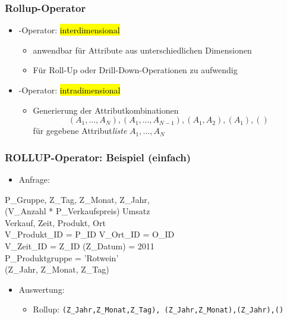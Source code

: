     \begin{frame}
    
    \frametitle{Rollup-Operator}
    
    
    \begin{itemize}
    \item {}-Operator: \hl{interdimensional}
      \begin{itemize}
      \item anwendbar für Attribute aus unterschiedlichen Dimensionen
      \item Für Roll-Up oder Drill-Down-Operationen zu aufwendig
      \end{itemize}
    \item {}-Operator: \hl{intradimensional}
      \begin{itemize}
      \item Generierung der Attributkombinationen
    $$
    (A_1, ..., A_N), (A_1, ..., A_{N-1}), (A_1, A_2), (A_1), ()
    $$
    für gegebene Attribut\textit{liste} $A_1, ..., A_N$
    \end{itemize}
    \end{itemize}
    
    \end{frame}
    
    
    
    \begin{frame}
    
    \frametitle{ROLLUP-Operator: Beispiel (einfach)}
    
    
    \begin{itemize}
    \item Anfrage:
    \end{itemize}
    
    \begin{sql}
      P\_Gruppe, Z\_Tag, Z\_Monat, Z\_Jahr, \\
    \1 (V\_Anzahl * P\_Verkaufspreis)  Umsatz \\
      Verkauf, Zeit, Produkt, Ort \\
       V\_Produkt\_ID = P\_ID  V\_Ort\_ID = O\_ID  \\
    \1   V\_Zeit\_ID = Z\_ID  (Z\_Datum) = 2011 \\
    \1 P\_Produktgruppe = 'Rotwein' \\
    (Z\_Jahr, Z\_Monat, Z\_Tag)
    \end{sql}
    
    \vspace*{-1em}
    \begin{itemize}
    \item Auswertung:
      \begin{itemize}
      \item Rollup: \texttt{(Z\_Jahr,Z\_Monat,Z\_Tag),
          (Z\_Jahr,Z\_Monat),(Z\_Jahr),()}
      \end{itemize}
    \end{itemize}
    
    \end{frame}
    

